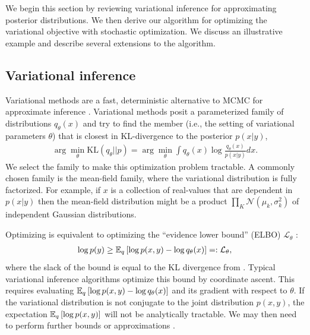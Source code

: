 We begin this section by reviewing variational inference for
approximating posterior distributions.  We then derive our algorithm
for optimizing the variational objective with stochastic optimization.
We discuss an illustrative example and describe several extensions to
the algorithm.

\subsection{Variational inference}

Variational methods are a fast, deterministic alternative to MCMC for
approximate inference \citep{jordan:2003,jordan:1999}. Variational
methods posit a parameterized family of distributions $q_{\theta}(x)$
and try to find the member (i.e., the setting of variational
parameters $\theta$) that is closest in KL-divergence to the posterior
$p(x | y)$,
\begin{align}
  \arg \min_{\theta} \mbox{KL}(q_\theta || p) = \arg \min_{\theta}
  \int q_\theta(x) \log \frac{q_\theta(x)}{p(x | y)} dx.
  \label{eq:stochastic_variational_objective}
\end{align}
We select the family to make this optimization problem tractable.  A
commonly chosen family is the mean-field family, where the variational
distribution is fully factorized.  For example, if $x$ is a collection
of real-values that are dependent in $p(x | y)$ then the mean-field
distribution might be a product $\prod_K \mathcal{N}(\mu_k,
\sigma_k^2)$ of independent Gaussian distributions.




Optimizing  is equivalent to optimizing
the ``evidence lower bound'' (ELBO) $\mathcal{L}_\theta$ \cite{bishop:2006}:
\begin{eqnarray}
  \log p(y) \ge \mathbb{E}_q\left[\log p(x, y) - \log q_\theta(x)\right]
  =: \mathcal{L}_\theta,
  \label{eq:stochastic_traditional_variational_objective}
\end{eqnarray}
where the slack of the bound is equal to the KL divergence from
.  Typical variational inference
algorithms optimize this bound by coordinate ascent.  This requires
evaluating $\mathbb{E}_q\left[ \log p(x, y) - \log q_\theta(x)\right]$ and its
gradient with respect to $\theta$. If the variational distribution is
not conjugate to the joint distribution $p(x, y)$, the expectation
$\mathbb{E}_q\left[ \log p(x, y)\right]$ will not be analytically tractable. We may
then need to perform further bounds or approximations
\citep{jaakkola:2000,jordan:1999,bickel:2007,braun:2007}.


